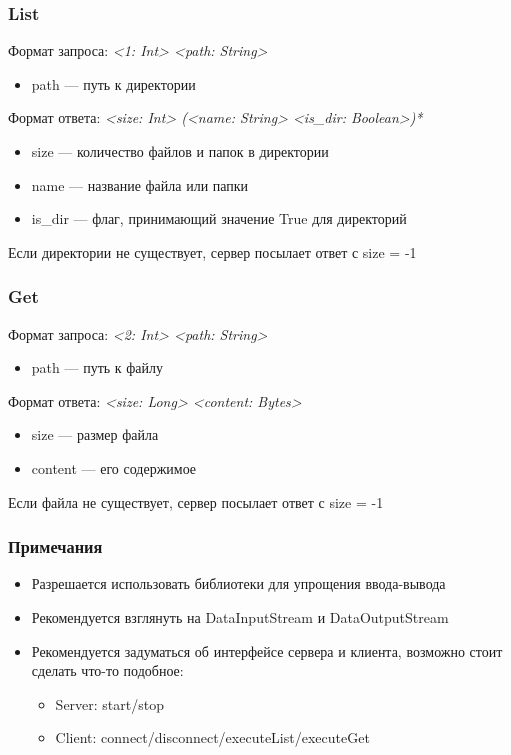 \documentclass[xetex,mathserif,serif]{beamer}
\begin{document}
	\begin{frame}
		\frametitle{List}
		Формат запроса: \textit{<1: Int> <path: String>}

		\begin{itemize}
			\item path --- путь к директории
		\end{itemize}

		Формат ответа: \textit{<size: Int> (<name: String> <is\_dir: Boolean>)*}

		\begin{itemize}
			\item size --- количество файлов и папок в директории
			\item name --- название файла или папки
			\item is\_dir --- флаг, принимающий значение True для директорий
		\end{itemize}
		Если директории не существует, сервер посылает ответ с size = -1
	\end{frame}

	\begin{frame}
		\frametitle{Get}
		Формат запроса: \textit{<2: Int> <path: String>}
		\begin{itemize}
			\item path --- путь к файлу
		\end{itemize}
		
		Формат ответа: \textit{<size: Long> <content: Bytes>}
		\begin{itemize}
			\item size --- размер файла
			\item content --- его содержимое
		\end{itemize}
		Если файла не существует, сервер посылает ответ с size = -1
	\end{frame}

	\begin{frame}
		\frametitle{Примечания}
		\begin{itemize}
			\item Разрешается использовать библиотеки для упрощения ввода-вывода
			\item Рекомендуется взглянуть на DataInputStream и DataOutputStream
			\item Рекомендуется задуматься об интерфейсе сервера и клиента, возможно стоит сделать что-то подобное:
			\begin{itemize}
				\item Server: start/stop
				\item Client: connect/disconnect/executeList/executeGet
			\end{itemize}
		\end{itemize}
	\end{frame}
\end{document}

